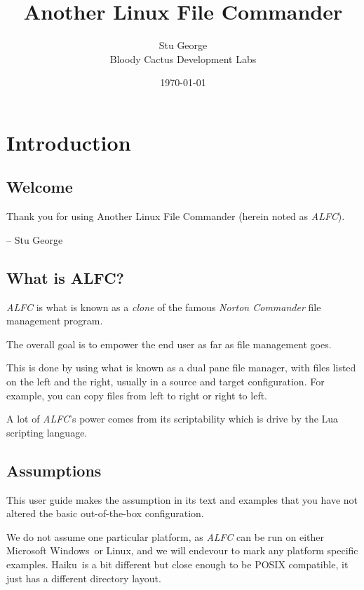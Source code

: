 \documentclass[letterpaper]{article}
\def\xbe{Haiku}
\def\xlin{Linux}
\def\xmswin{Microsoft Windows}
\def\xapp{Another Linux File Commander}
\def\xauthor{Stu George}
\def\xdeveloper{Bloody Cactus Development Labs}
\begin{document}
\title{\xapp}
\author{\xauthor\\\xdeveloper}
\date{\today}
\maketitle


\vfill \eject

\tableofcontents

\vfill \eject
\setlength{\parskip}{3mm}
\section{Introduction}
\subsection{Welcome}
Thank you for using Another Linux File Commander (herein noted as \textsl{ALFC}).

\begin{flushright}
-- \xauthor
\end{flushright}

\vfill \eject
\subsection{What is ALFC?}
\textsl{ALFC} is what is known as a \textsl{clone} of the famous \textsl{Norton Commander} 
file management program.

The overall goal is to empower the end user as far as file management goes.

This is done by using what is known as a dual pane file manager, with files listed on the left
and the right, usually in a source and target configuration. For example, you can copy files from left to right or right to left.

A lot of \textsl{ALFC}'s power comes from its scriptability which is drive by the Lua scripting language.

\subsection{Assumptions}
This user guide makes the assumption in its text and examples that you have not altered the
basic out-of-the-box configuration.

We do not assume one particular platform, as \textsl{ALFC} can be run on either \xmswin\ or \xlin, and we will endevour to mark any platform specific examples. \xbe\ is a bit different but close enough to be POSIX compatible, it just has a different directory layout.
\end{document}
